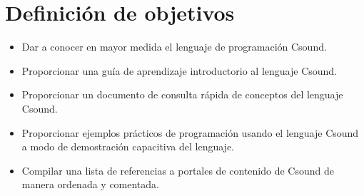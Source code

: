 \chapter{Definici\'on de objetivos}\label{defobjetivos}
	
\begin{itemize}
\item Dar a conocer en mayor medida el lenguaje de programación Csound.
\item Proporcionar una guía de aprendizaje introductorio al lenguaje Csound.
\item Proporcionar un documento de consulta rápida de conceptos del lenguaje Csound.
\item Proporcionar ejemplos prácticos de programación usando el lenguaje Csound a modo de demostración capacitiva del lenguaje.
\item Compilar una lista de referencias a portales de contenido de Csound de manera ordenada y comentada.
\end{itemize}
